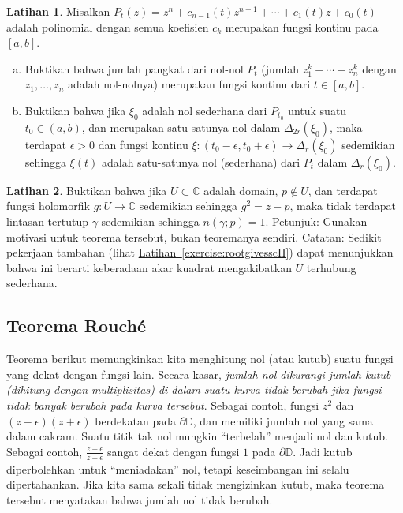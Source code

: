 \documentclass[12pt,openany]{book}
\newcommand{\C}{{\mathbb{C}}}
\newcommand{\D}{{\mathbb{D}}}
\newcommand{\myquote}[1]{``#1''}
\theoremstyle{plain}
\theoremstyle{remark}
\theoremstyle{definition}
\newenvironment{exbox}{%
    \def\FrameCommand{\vrule width 1pt \relax\hspace{10pt}}%
    \MakeFramed{\advance\hsize-\width\FrameRestore}%
}{%
    \endMakeFramed
}
\newenvironment{exparts}{%
    \leavevmode\begin{enumerate}[a),noitemsep,topsep=0pt,parsep=0pt,partopsep=0pt]
}{%
    \end{enumerate}
}
\theoremstyle{exercise}
\newtheorem{exercise}{Latihan}[section]
\theoremstyle{example}
\newcommand{\exerciseref}[1]{\hyperref[#1]{Latihan~\ref*{#1}}}
\begin{document}
\begin{exbox}
\begin{exercise}
Misalkan $P_t(z) = z^n + c_{n-1}(t) z^{n-1} + \cdots + c_1(t) z + c_0(t)$
adalah polinomial dengan semua koefisien $c_k$ merupakan fungsi kontinu
pada $[a,b]$.
\begin{exparts}
\item
Buktikan bahwa jumlah pangkat dari nol-nol $P_t$
(jumlah $z_1^k+\cdots+z_n^k$ dengan $z_1,\ldots,z_n$ adalah nol-nolnya)
merupakan
fungsi kontinu dari $t \in [a,b]$.
\item
Buktikan bahwa jika $\xi_0$ adalah nol sederhana dari $P_{t_0}$ untuk suatu $t_0 \in (a,b)$,
dan merupakan satu-satunya nol dalam
$\Delta_{2r}(\xi_0)$, maka
terdapat $\epsilon > 0$ dan fungsi kontinu $\xi \colon
(t_0-\epsilon,t_0+\epsilon) \to \Delta_r(\xi_0)$ sedemikian sehingga $\xi(t)$
adalah satu-satunya nol (sederhana) dari $P_t$ dalam $\Delta_r(\xi_0)$.
\end{exparts}
\end{exercise}

\begin{exercise} \label{exercise:rootgivesscI}
\pagebreak[3]
Buktikan bahwa jika $U \subset \C$ adalah domain, $p \notin U$, dan
terdapat fungsi holomorfik $g \colon U \to \C$ sedemikian sehingga $g^2 = z-p$, maka
tidak terdapat lintasan tertutup $\gamma$ sedemikian sehingga $n(\gamma;p)=1$.
Petunjuk: Gunakan motivasi untuk teorema tersebut, bukan teoremanya sendiri.
Catatan: Sedikit pekerjaan tambahan (lihat \exerciseref{exercise:rootgivesscII})
dapat menunjukkan bahwa ini berarti keberadaan
akar kuadrat mengakibatkan $U$ terhubung sederhana.
\end{exercise}
\end{exbox}

\subsection{Teorema Rouch\'e}

Teorema berikut memungkinkan kita menghitung nol (atau kutub) suatu fungsi yang
dekat dengan fungsi lain. Secara kasar,
\emph{jumlah nol dikurangi
jumlah kutub (dihitung dengan multiplisitas) di dalam suatu kurva tidak berubah
jika fungsi tidak banyak berubah pada kurva tersebut}.
Sebagai contoh, fungsi $z^2$ dan $(z-\epsilon)(z+\epsilon)$
berdekatan pada $\partial \D$, dan memiliki jumlah
nol yang sama dalam cakram.
Suatu titik tak nol mungkin \myquote{terbelah} menjadi nol dan
kutub. Sebagai contoh, $\frac{z-\epsilon}{z+\epsilon}$ sangat dekat dengan fungsi
$1$ pada $\partial \D$.  Jadi kutub diperbolehkan untuk \myquote{meniadakan} nol, tetapi
keseimbangan ini selalu dipertahankan.  Jika kita sama sekali tidak mengizinkan kutub,
maka teorema tersebut menyatakan bahwa jumlah nol tidak berubah.
\end{document}
